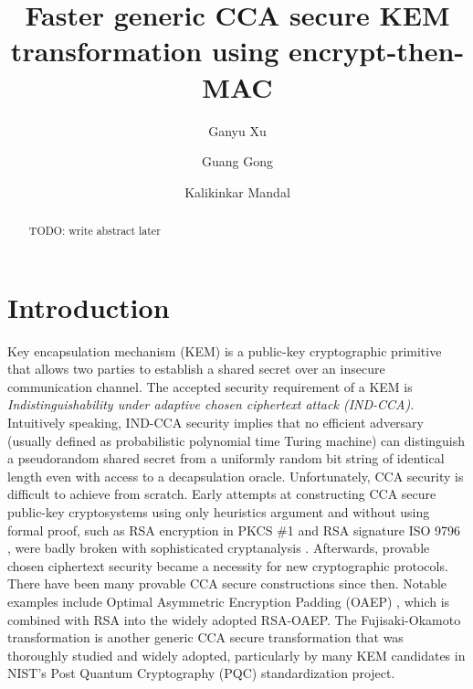 \documentclass[runningheads]{llncs}
\begin{document}
\title{Faster generic CCA secure KEM transformation using encrypt-then-MAC}

\author{
    Ganyu Xu \and
    Guang Gong \and
    Kalikinkar Mandal
}


\maketitle              %
%
\begin{abstract}
    {\color{red} TODO: write abstract later}
\end{abstract}

\section{Introduction}\label{sec:introduction}
Key encapsulation mechanism (KEM) is a public-key cryptographic primitive that allows two parties to establish a shared secret over an insecure communication channel. The accepted security requirement of a KEM is \textit{Indistinguishability under adaptive chosen ciphertext attack (IND-CCA)}. Intuitively speaking, IND-CCA security implies that no efficient adversary (usually defined as probabilistic polynomial time Turing machine) can distinguish a pseudorandom shared secret from a uniformly random bit string of identical length even with access to a decapsulation oracle. Unfortunately, CCA security is difficult to achieve from scratch. Early attempts at constructing CCA secure public-key cryptosystems using only heuristics argument and without using formal proof, such as RSA encryption in PKCS \#1 \cite{rfc2313} and RSA signature ISO 9796 \cite{ISO9796-1}, were badly broken with sophisticated cryptanalysis \cite{DBLP:conf/crypto/Bleichenbacher98,coppersmith1999iso,DBLP:conf/crypto/CoronNS99}. Afterwards, provable chosen ciphertext security became a necessity for new cryptographic protocols. There have been many provable CCA secure constructions since then. Notable examples include Optimal Asymmetric Encryption Padding (OAEP) \cite{DBLP:conf/eurocrypt/BellareR94}, which is combined with RSA \cite{DBLP:conf/crypto/FujisakiOPS01} into the widely adopted RSA-OAEP. The Fujisaki-Okamoto transformation \cite{DBLP:conf/crypto/FujisakiO99,DBLP:conf/tcc/HofheinzHK17} is another generic CCA secure transformation that was thoroughly studied and widely adopted, particularly by many KEM candidates in NIST's Post Quantum Cryptography (PQC) standardization project.
\end{document}
